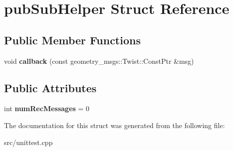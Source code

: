 \section{pub\+Sub\+Helper Struct Reference}
\label{structpub_sub_helper}
\subsection*{Public Member Functions}
\begin{DoxyCompactItemize}
\item 
void {\bfseries callback} (const geometry\+\_\+msgs\+::\+Twist\+::\+Const\+Ptr \&msg)\label{structpub_sub_helper_ad078027647718453f1340be7d43332e8}

\end{DoxyCompactItemize}
\subsection*{Public Attributes}
\begin{DoxyCompactItemize}
\item 
int {\bfseries num\+Rec\+Messages} = 0\label{structpub_sub_helper_a9ff07f43c4df37706418b77548236461}

\end{DoxyCompactItemize}


The documentation for this struct was generated from the following file\+:\begin{DoxyCompactItemize}
\item 
src/unittest.\+cpp\end{DoxyCompactItemize}

